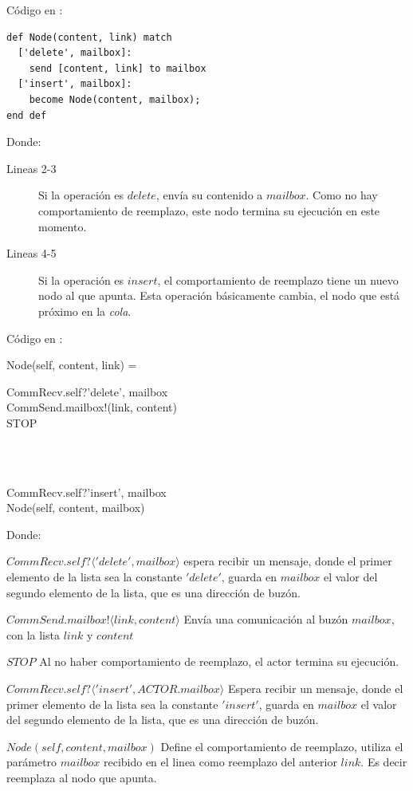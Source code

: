 Código en \SAL:

\begin{lstlisting}[language=sal, style=simple]
def Node(content, link) match
  ['delete', mailbox]:
    send [content, link] to mailbox
  ['insert', mailbox]:
    become Node(content, mailbox);
end def
\end{lstlisting}

Donde:

\begin{description}
 \item [Lineas 2-3] Si la operación es $delete$, envía su contenido a $mailbox$. Como no hay comportamiento de reemplazo, este nodo termina su ejecución en este momento.
 \item [Lineas 4-5] Si la operación es $insert$, el comportamiento de reemplazo tiene un nuevo nodo al que apunta. Esta operación básicamente cambia, el nodo que está próximo en la \textit{cola}.
\end{description}

Código en \CSP:

\begin{process}
Node(self, content, link) = \\ \quad
  \begin{block}
  CommRecv.self?\langle 'delete', mailbox \rangle \then \\
  CommSend.mailbox!(link, content) \then \\
  STOP
  \end{block} \\

  \Extchoice \\ \quad
  
  \begin{block}
  CommRecv.self?\langle 'insert', mailbox \rangle \then \\
  Node(self, content, mailbox)
  \end{block}
\end{process}

Donde: 

\begin{description}
 \item $CommRecv.self?\langle 'delete', mailbox \rangle$ espera recibir un mensaje, donde el primer elemento de la lista sea la constante $'delete'$, guarda en $mailbox$ el valor del segundo elemento de la lista, que es una dirección de buzón.
 \item $CommSend.mailbox!\langle link, content \rangle$ Envía una comunicación al buzón $mailbox$, con la lista $link$ y $content$
 \item $STOP$ Al no haber comportamiento de reemplazo, el actor termina su ejecución.
 \item $CommRecv.self?\langle 'insert', ACTOR.mailbox \rangle$ Espera recibir un mensaje, donde el primer elemento de la lista sea la constante $'insert'$, guarda en $mailbox$ el valor del segundo elemento de la lista, que es una dirección de buzón.
 \item $Node(self, content, mailbox)$ Define el comportamiento de reemplazo, utiliza el parámetro $mailbox$ recibido en el linea como reemplazo del anterior $link$. Es decir reemplaza al nodo que apunta.
\end{description}

